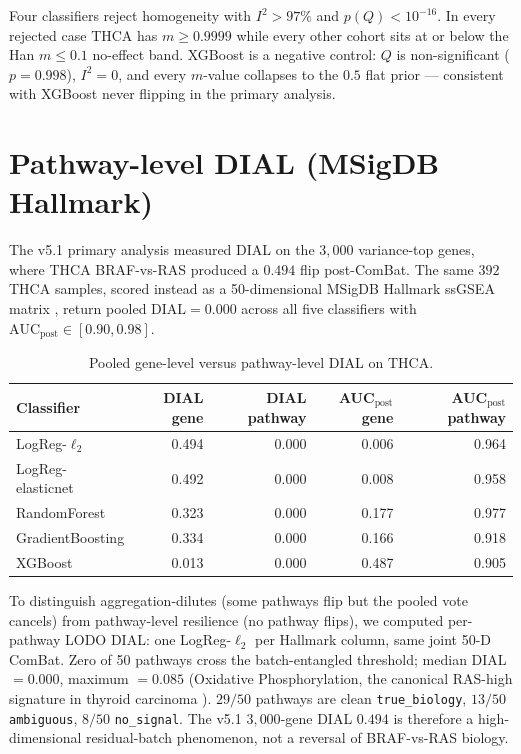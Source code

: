 \documentclass[11pt,a4paper]{article}
\begin{document}
Four classifiers reject homogeneity with $I^2 > 97\%$ and
$p(Q) < 10^{-16}$. In every rejected case THCA has $m \geq 0.9999$
while every other cohort sits at or below the Han $m \leq 0.1$
no-effect band. XGBoost is a negative control: $Q$ is non-significant
($p = 0.998$), $I^2 = 0$, and every $m$-value collapses to the $0.5$
flat prior --- consistent with XGBoost never flipping in the primary
analysis.

\section{Pathway-level DIAL (MSigDB Hallmark)}
\label{sec:S4}

The v5.1 primary analysis measured DIAL on the $3{,}000$
variance-top genes, where THCA BRAF-vs-RAS produced a $0.494$ flip
post-ComBat. The same $392$ THCA samples, scored instead as a
50-dimensional MSigDB Hallmark \citep{liberzon2015hallmark} ssGSEA
matrix \citep{barbie2009ssgsea, hanzelmann2013gsva}, return pooled
$\mathrm{DIAL} = 0.000$ across all five classifiers with
$\mathrm{AUC}_{\mathrm{post}} \in [0.90, 0.98]$.

\begin{table}[htbp]
\centering
\small
\begin{tabular}{lrrrr}\toprule
Classifier & DIAL gene & DIAL pathway & AUC$_{\mathrm{post}}$ gene &
AUC$_{\mathrm{post}}$ pathway \\ \midrule
LogReg-$\ell_2$        & 0.494 & 0.000 & 0.006 & 0.964 \\
LogReg-elasticnet      & 0.492 & 0.000 & 0.008 & 0.958 \\
RandomForest           & 0.323 & 0.000 & 0.177 & 0.977 \\
GradientBoosting       & 0.334 & 0.000 & 0.166 & 0.918 \\
XGBoost                & 0.013 & 0.000 & 0.487 & 0.905 \\
\bottomrule\end{tabular}
\caption{Pooled gene-level versus pathway-level DIAL on THCA.}
\label{tab:s4a}
\end{table}

To distinguish aggregation-dilutes (some pathways flip but the pooled
vote cancels) from pathway-level resilience (no pathway flips), we
computed per-pathway LODO DIAL: one LogReg-$\ell_2$ per Hallmark
column, same joint 50-D ComBat. Zero of 50 pathways cross the
batch-entangled threshold; median DIAL $= 0.000$, maximum $= 0.085$
(Oxidative Phosphorylation, the canonical RAS-high signature in
thyroid carcinoma \citep{landa2016thyroid}). $29/50$ pathways are
clean \texttt{true\_biology}, $13/50$ \texttt{ambiguous}, $8/50$
\texttt{no\_signal}. The v5.1 $3{,}000$-gene DIAL $0.494$ is therefore
a high-dimensional residual-batch phenomenon, not a reversal of
BRAF-vs-RAS biology.
\end{document}
